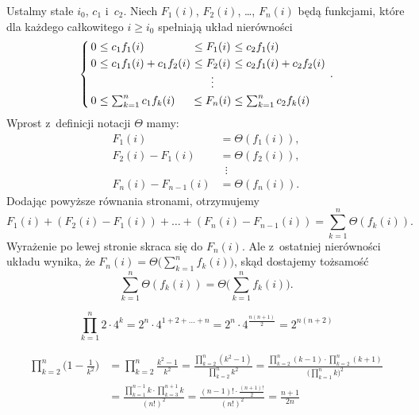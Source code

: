 Ustalmy stałe $i_0$, $c_1$ i~$c_2$.
Niech $F_1(i)$, $F_2(i)$, \dots, $F_n(i)$ będą funkcjami, które dla każdego całkowitego $i\ge i_0$ spełniają układ nierówności
\[
	\arraycolsep=1.5pt
	\left\{\begin{array}{rlcl}
		0 &\le c_1f_1(i) &\le F_1(i) &\le c_2f_1(i) \\[1mm]
		0 &\le c_1f_1(i)+c_1f_2(i) &\le F_2(i) &\le c_2f_1(i)+c_2f_2(i) \\
		&& \vdots & \\[1mm]
		0 &\le \sum_{k=1}^nc_1f_k(i) &\le F_n(i) &\le \sum_{k=1}^nc_2f_k(i)
	\end{array}\right..
\]
Wprost z~definicji notacji $\Theta$ mamy:
\begin{align*}
	F_1(i) &= \Theta(f_1(i)), \\
	F_2(i)-F_1(i) &= \Theta(f_2(i)), \\
	& \,\,\,\vdots \\
	F_n(i)-F_{n-1}(i) &= \Theta(f_n(i)).
\end{align*}
Dodając powyższe równania stronami, otrzymujemy
\[
	F_1(i)+(F_2(i)-F_1(i))+\dots+(F_n(i)-F_{n-1}(i)) = \sum_{k=1}^n\Theta(f_k(i)).
\]
Wyrażenie po lewej stronie skraca się do $F_n(i)$.
Ale z~ostatniej nierówności układu wynika, że $F_n(i)=\Theta\bigl(\sum_{k=1}^nf_k(i)\bigr)$, skąd dostajemy tożsamość
\[
	\sum_{k=1}^n\Theta(f_k(i)) = \Theta\biggl(\sum_{k=1}^nf_k(i)\biggr).
\]

\exercise %
\[
	\prod_{k=1}^n2\cdot4^k = 2^n\cdot4^{1+2+\dots+n} = 2^n\cdot4^{\frac{n(n+1)}{2}} = 2^{n(n+2)}
\]

\exercise %
\begin{align*}
	\prod_{k=2}^n\biggl(1-\frac{1}{k^2}\biggr) &= \prod_{k=2}^n\frac{k^2-1}{k^2} = \frac{\prod_{k=2}^n(k^2-1)}{\prod_{k=2}^nk^2} = \frac{\prod_{k=2}^n(k-1)\cdot\prod_{k=2}^n(k+1)}{\bigl(\prod_{k=1}^nk\bigr)^2} \\[2mm]
	&= \frac{\prod_{k=1}^{n-1}k\cdot\prod_{k=3}^{n+1}k}{(n!)^2} = \frac{(n-1)!\cdot\frac{(n+1)!}{2}}{(n!)^2} = \frac{n+1}{2n}
\end{align*}
